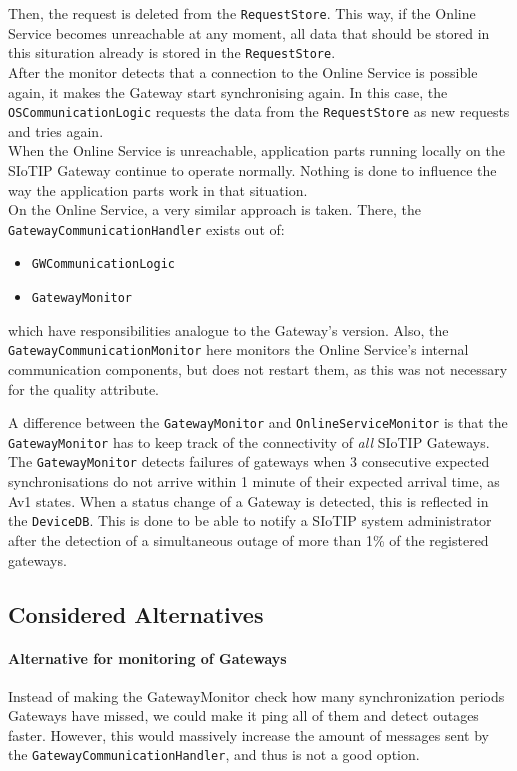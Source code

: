         Then, the request is deleted from the \texttt{RequestStore}. This way, if the Online Service becomes unreachable at any moment,
        all data that should be stored in this situration already is stored in the \texttt{RequestStore}.\\
        After the monitor detects that a connection to the Online Service is possible again, it makes the Gateway start synchronising again.
        In this case, the \texttt{OSCommunicationLogic} requests the data from the \texttt{RequestStore} as new requests and tries again. \\
        When the Online Service is unreachable, application parts running locally on the SIoTIP Gateway continue to operate normally. Nothing is done
        to influence the way the application parts work in that situation.\\

        On the Online Service, a very similar approach is taken. There, the \texttt{GatewayCommunicationHandler} exists out of:
        \begin{itemize}
            \item \texttt{GWCommunicationLogic}
            \item \texttt{GatewayMonitor}
        \end{itemize}
        which have responsibilities analogue to the Gateway's version. Also, the \texttt{GatewayCommunicationMonitor}
        here monitors the Online Service's internal communication components, but does not restart them, as this was not necessary for the quality attribute.

        A difference between the \texttt{GatewayMonitor} and \texttt{OnlineServiceMonitor} is that the \texttt{GatewayMonitor}
        has to keep track of the connectivity of \emph{all} SIoTIP Gateways. The \texttt{GatewayMonitor} detects failures of
        gateways when 3 consecutive expected synchronisations do not arrive within 1 minute of their expected arrival time,
        as Av1 states. When a status change of a Gateway is detected, this is reflected in the \texttt{DeviceDB}. This is
        done to be able to notify a SIoTIP system administrator after the detection
        of a simultaneous outage of more than 1\% of the registered gateways.

    \subsection*{Considered Alternatives}
        \paragraph{Alternative for monitoring of Gateways}
            Instead of making the GatewayMonitor check how many synchronization periods Gateways have missed,
            we could make it ping all of them and detect outages faster. However, this would massively increase
            the amount of messages sent by the \texttt{GatewayCommunicationHandler}, and thus is not a good option.

